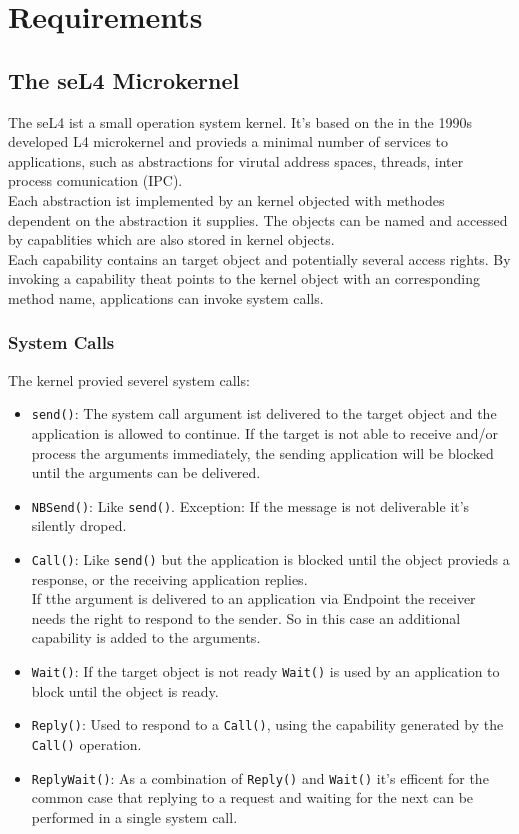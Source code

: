 \documentclass[pdftex,11pt,a4paper]{article}
\begin{document}
	
	\clearpage
	
	\section{Requirements}
	\subsection{The seL4 Microkernel}
	The seL4 \cite{Manual} ist a small operation system kernel. It's based on the in the 1990s developed L4 microkernel and provieds a minimal number of services to applications, such as abstractions for virutal address spaces, threads, inter process comunication (IPC). \\
	Each abstraction ist implemented by an kernel objected with methodes dependent on the abstraction it supplies. The objects can be named and accessed by capablities which are also stored in kernel objects. \\
	Each capability contains an target object and potentially several access rights. By invoking a capability theat points to the kernel object  with an corresponding method name, applications can invoke system calls.
	\subsubsection{System Calls}
	The kernel provied severel system calls: \\
	\begin{itemize}
	\item \texttt{send()}: The system call argument ist delivered to the target object and the application is allowed to continue. If the target is not able to receive and/or process the arguments immediately, the sending application will be blocked until the arguments can be delivered.
	\item \texttt{NBSend()}: Like \texttt{send()}. Exception: If the message is not deliverable it's silently droped.
	\item \texttt{Call()}: Like \texttt{send()} but the application is blocked until the object provieds a response, or the receiving application replies. \\
	If tthe argument is delivered to an application via Endpoint the receiver needs the right to respond to the sender. So in this case an additional capability is added to the arguments. 
	\item \texttt{Wait()}: If the target object is not ready \texttt{Wait()} is used by an application to block until the object is ready. 
	\item \texttt{Reply()}: Used to respond to a \texttt{Call()}, using the capability generated by the \texttt{Call()} operation.
	\item \texttt{ReplyWait()}: As a combination of \texttt{Reply()} and \texttt{Wait()} it's efficent for the common case that replying to a request and waiting for the next can be performed in a single system call. 
	\end{itemize}
	\newpage
\end{document}
